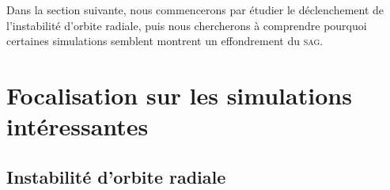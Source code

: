 


	Dans la section suivante, nous commencerons par étudier le déclenchement de l'instabilité d'orbite radiale, puis nous chercherons à comprendre
	pourquoi certaines simulations semblent montrent un effondrement du \textsc{sag}.

\section{Focalisation sur les simulations intéressantes}
	\subsection{Instabilité d'orbite radiale}

